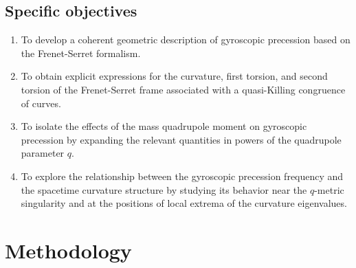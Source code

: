 \documentclass[12pt]{article}
\begin{document}
\subsection{Specific objectives}

\begin{enumerate}
	\item To develop a coherent geometric description of gyroscopic precession based on the Frenet-Serret formalism.
	\item To obtain explicit expressions for the curvature, first torsion, and second torsion of the Frenet-Serret frame associated with a quasi-Killing congruence of curves.
	\item To isolate the effects of the mass quadrupole moment on gyroscopic precession by expanding the relevant quantities in powers of the quadrupole parameter $q$.
	\item To explore the relationship between the gyroscopic precession frequency and the spacetime curvature structure by studying its behavior near the $q$-metric singularity and at the positions of local extrema of the curvature eigenvalues.
\end{enumerate}

\section{Methodology}
\end{document}
